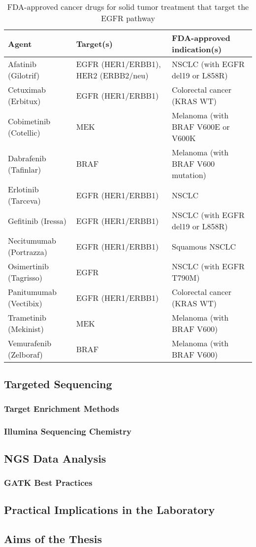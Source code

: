     \begin{table}[!htbp]
        \caption[Targeted Cancer Agents]{FDA-approved cancer drugs for solid tumor treatment that target the EGFR pathway}
        \centering
        \begin{tabular}{ |p{4cm}|p{3.7cm}|p{6.3cm}|}
        \hline
        Agent & Target(s) & FDA-approved indication(s) \\ \hline \hline
        Afatinib (Gilotrif) & EGFR (HER1/ERBB1), HER2 (ERBB2/neu) & NSCLC (with EGFR del19 or L858R) \\
        Cetuximab (Erbitux) & EGFR (HER1/ERBB1) & Colorectal cancer (KRAS WT) \\
        Cobimetinib (Cotellic) & MEK & Melanoma (with BRAF V600E or V600K \\
        Dabrafenib (Tafinlar) & BRAF & Melanoma (with BRAF V600 mutation) \\
        Erlotinib (Tarceva) & EGFR (HER1/ERBB1) & NSCLC \\
        Gefitinib (Iressa) & EGFR (HER1/ERBB1) & NSCLC (with EGFR del19 or L858R) \\
        Necitumumab (Portrazza) & EGFR (HER1/ERBB1) & Squamous NSCLC \\
        Osimertinib (Tagrisso) & EGFR & NSCLC (with EGFR T790M) \\
        Panitumumab (Vectibix) & EGFR (HER1/ERBB1) & Colorectal cancer (KRAS WT) \\
        Trametinib (Mekinist) & MEK & Melanoma (with BRAF V600) \\
        Vemurafenib (Zelboraf) & BRAF & Melanoma (with BRAF V600) \\
        \hline
      \end{tabular}
    \end{table}

  \subsection{Targeted Sequencing}

    \subsubsection{Target Enrichment Methods}

    \subsubsection{Illumina Sequencing Chemistry}

  \subsection{NGS Data Analysis}

    \subsubsection{GATK Best Practices}

  \subsection{Practical Implications in the Laboratory}

  \subsection{Aims of the Thesis}
